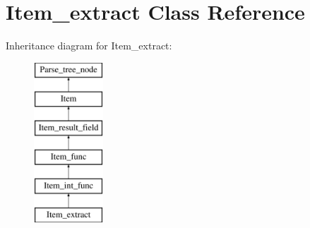 \hypertarget{classItem__extract}{}\section{Item\+\_\+extract Class Reference}
\label{classItem__extract}
Inheritance diagram for Item\+\_\+extract\+:\begin{figure}[H]
\begin{center}
\leavevmode
\includegraphics[height=6.000000cm]{classItem__extract}
\end{center}
\end{figure}
